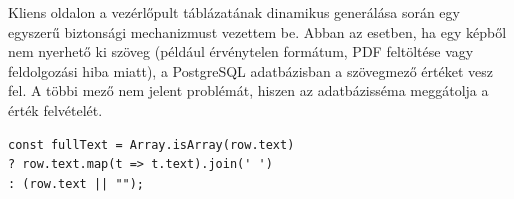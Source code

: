 \documentclass[12pt]{article}
\begin{document}
	Kliens oldalon a vezérlőpult táblázatának dinamikus generálása során egy egyszerű biztonsági mechanizmust vezettem be. Abban az esetben, ha egy képből nem nyerhető ki szöveg (például érvénytelen formátum, PDF feltöltése vagy feldolgozási hiba miatt), a PostgreSQL adatbázisban a szövegmező  értéket vesz fel. A többi mező nem jelent problémát, hiszen az adatbázisséma meggátolja a  érték felvételét.
	
	\begin{verbatim}
const fullText = Array.isArray(row.text) 
? row.text.map(t => t.text).join(' ') 
: (row.text || "");
	\end{verbatim}
	
	\clearpage
	
\end{document}
